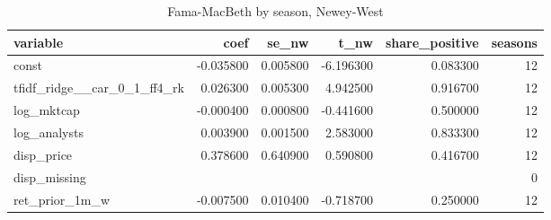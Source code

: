 \begin{table}
\caption{Fama-MacBeth by season, Newey-West}
\label{tab:t8_fama_macbeth__tfidf_ridge__car_0_1_ff4__car_0_1_ff4__validation}
\begin{tabular}{lrrrrr}
\toprule
variable & coef & se\_nw & t\_nw & share\_positive & seasons \\
\midrule
const & -0.035800 & 0.005800 & -6.196300 & 0.083300 & 12 \\
tfidf\_ridge\_\_car\_0\_1\_ff4\_rk & 0.026300 & 0.005300 & 4.942500 & 0.916700 & 12 \\
log\_mktcap & -0.000400 & 0.000800 & -0.441600 & 0.500000 & 12 \\
log\_analysts & 0.003900 & 0.001500 & 2.583000 & 0.833300 & 12 \\
disp\_price & 0.378600 & 0.640900 & 0.590800 & 0.416700 & 12 \\
disp\_missing &  &  &  &  & 0 \\
ret\_prior\_1m\_w & -0.007500 & 0.010400 & -0.718700 & 0.250000 & 12 \\
\bottomrule
\end{tabular}
\end{table}
